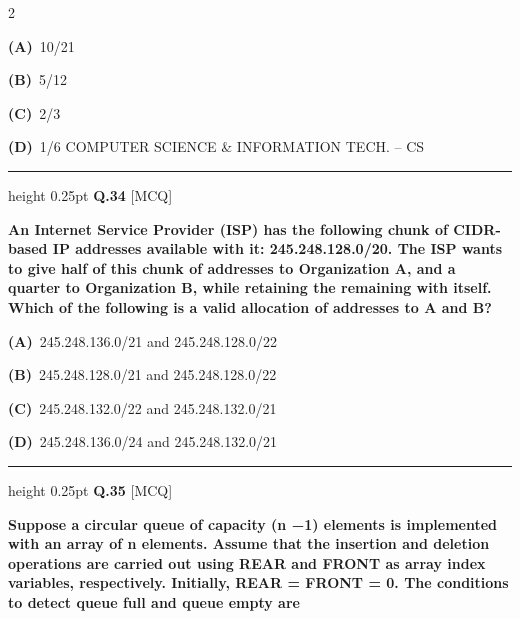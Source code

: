 \documentclass[a4paper,10pt,twoside]{article}
\begin{document}
\begin{multicols}{2}
\par\vspace{2pt}\noindent
\textbf{(A)}~10/21\par\vspace{2pt}\noindent
\textbf{(B)}~5/12\par\vspace{2pt}\noindent
\textbf{(C)}~2/3\par\vspace{2pt}\noindent
\textbf{(D)}~1/6  COMPUTER SCIENCE \& INFORMATION TECH. -- CS
\par\vspace{6pt}\hrule height 0.25pt\vspace{6pt}
\noindent\textbf{Q.34} \hfill {\footnotesize\textsf{[MCQ]}}
\par\vspace{2pt}
{\bfseries An Internet Service Provider (ISP) has the following chunk of CIDR-based IP addresses available
with it: 245.248.128.0/20. The ISP wants to give half of this chunk of addresses to Organization A,
and a quarter to Organization B, while retaining the remaining with itself. Which of the following is
a valid allocation of addresses to A and B? \par}
\par\vspace{2pt}\noindent
\textbf{(A)}~245.248.136.0/21 and 245.248.128.0/22\par\vspace{2pt}\noindent
\textbf{(B)}~245.248.128.0/21 and 245.248.128.0/22\par\vspace{2pt}\noindent
\textbf{(C)}~245.248.132.0/22 and 245.248.132.0/21\par\vspace{2pt}\noindent
\textbf{(D)}~245.248.136.0/24 and 245.248.132.0/21
\par\vspace{6pt}\hrule height 0.25pt\vspace{6pt}
\noindent\textbf{Q.35} \hfill {\footnotesize\textsf{[MCQ]}}
\par\vspace{2pt}
{\bfseries Suppose a circular queue of capacity (n −1) elements is implemented with an array of n elements.
Assume that the insertion and deletion operations are carried out using REAR and FRONT as array
index variables, respectively. Initially, REAR = FRONT = 0. The conditions to detect queue full
and queue empty are \par}

\end{multicols}
\end{document}
